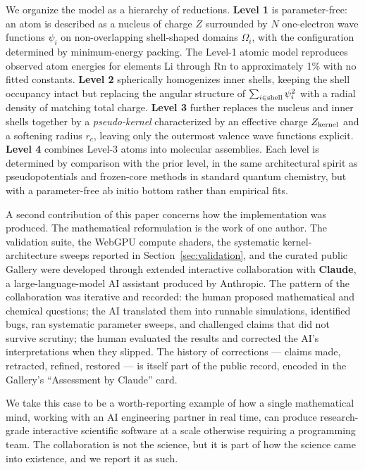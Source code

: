 \documentclass[11pt]{article}
\begin{document}
We organize the model as a hierarchy of reductions. \textbf{Level 1} is parameter-free: an atom is described as a nucleus of charge $Z$ surrounded by $N$ one-electron wave functions $\psi_i$ on non-overlapping shell-shaped domains $\Omega_i$, with the configuration determined by minimum-energy packing. The Level-1 atomic model reproduces observed atom energies for elements Li through Rn to approximately 1\% with no fitted constants. \textbf{Level 2} spherically homogenizes inner shells, keeping the shell occupancy intact but replacing the angular structure of $\sum_{i \in {\rm shell}} \psi_i^2$ with a radial density of matching total charge. \textbf{Level 3} further replaces the nucleus and inner shells together by a \emph{pseudo-kernel} characterized by an effective charge $Z_{\rm kernel}$ and a softening radius $r_c$, leaving only the outermost valence wave functions explicit. \textbf{Level 4} combines Level-3 atoms into molecular assemblies. Each level is determined by comparison with the prior level, in the same architectural spirit as pseudopotentials and frozen-core methods in standard quantum chemistry, but with a parameter-free ab initio bottom rather than empirical fits.

A second contribution of this paper concerns how the implementation was produced. The mathematical reformulation is the work of one author. The validation suite, the WebGPU compute shaders, the systematic kernel-architecture sweeps reported in Section~\ref{sec:validation}, and the curated public Gallery were developed through extended interactive collaboration with \textbf{Claude}, a large-language-model AI assistant produced by Anthropic. The pattern of the collaboration was iterative and recorded: the human proposed mathematical and chemical questions; the AI translated them into runnable simulations, identified bugs, ran systematic parameter sweeps, and challenged claims that did not survive scrutiny; the human evaluated the results and corrected the AI's interpretations when they slipped. The history of corrections --- claims made, retracted, refined, restored --- is itself part of the public record, encoded in the Gallery's ``Assessment by Claude'' card.

We take this case to be a worth-reporting example of how a single mathematical mind, working with an AI engineering partner in real time, can produce research-grade interactive scientific software at a scale otherwise requiring a programming team. The collaboration is not the science, but it is part of how the science came into existence, and we report it as such.
\end{document}
